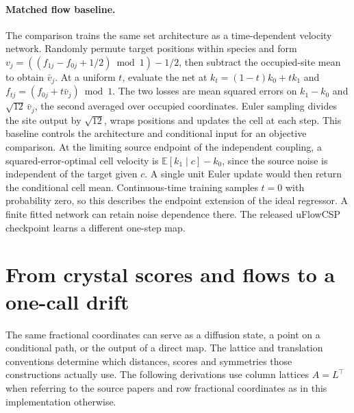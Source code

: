 \paragraph{Matched flow baseline.}
The comparison trains the same set architecture as a time-dependent velocity network. Randomly permute target positions within species and form $v_j=((f_{1j}-f_{0j}+1/2)\bmod1)-1/2$, then subtract the occupied-site mean to obtain $\bar v_j$. At a uniform $t$, evaluate the net at $k_t=(1-t)k_0+tk_1$ and $f_{tj}=(f_{0j}+t\bar v_j)\bmod1$. The two losses are mean squared errors on $k_1-k_0$ and $\sqrt{12}\,\bar v_j$, the second averaged over occupied coordinates. Euler sampling divides the site output by $\sqrt{12}$, wraps positions and updates the cell at each step. This baseline controls the architecture and conditional input for an objective comparison. At the limiting source endpoint of the independent coupling, a squared-error-optimal cell velocity is $\mathbb E[k_1\mid c]-k_0$, since the source noise is independent of the target given $c$. A single unit Euler update would then return the conditional cell mean. Continuous-time training samples $t=0$ with probability zero, so this describes the endpoint extension of the ideal regressor. A finite fitted network can retain noise dependence there. The released uFlowCSP checkpoint learns a different one-step map.

\newpage
\ifdefined\crytalmark{}\fi
\section{From crystal scores and flows to a one-call drift}\label{s:crystalflows}
The same fractional coordinates can serve as a diffusion state, a point on a conditional path, or the output of a direct map. The lattice and translation conventions determine which distances, scores and symmetries those constructions actually use. The following derivations use column lattices $A=L^\top$ when referring to the source papers and row fractional coordinates as in this implementation otherwise.

